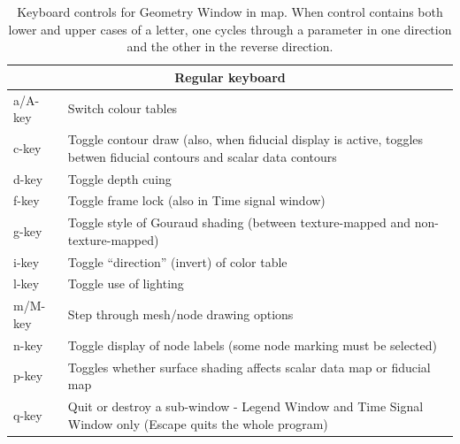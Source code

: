 \begin{table}[htbp]
        \caption{\label{table:keys} Keyboard controls for Geometry Window
          in map{}.  When control contains both lower and upper cases of a
          letter, one cycles through a parameter in one direction and the
          other in the reverse direction.}
    \begin{center}
        \begin{tabular}{|l|p{6in}|} \hline
        \multicolumn{2}{|c|}{\textbf{Regular keyboard}} \\ \hline
        a/A-key   &       Switch colour tables \\ \hline
        c-key   &       Toggle contour draw  (also, when fiducial display
	is active, toggles betwen fiducial contours and scalar data contours \\ \hline
        d-key   &       Toggle depth cuing\\ \hline
        f-key   &       Toggle frame lock (also in Time signal window)\\ \hline
       g-key   &       Toggle style of Gouraud shading (between
       texture-mapped and non-texture-mapped) \\ \hline 
        i-key   &       Toggle ``direction'' (invert) of color table\\ \hline
        l-key   &       Toggle use of lighting\\ \hline
        m/M-key   &       Step through mesh/node drawing options \\ \hline
        n-key   &       Toggle display of node labels (some node marking
        must be selected)\\ \hline 
        p-key   &       Toggles whether surface shading affects scalar data map or
	fiducial map \\ \hline 
         q-key   &       Quit or destroy a sub-window - Legend Window and
         Time Signal Window only (Escape quits the 
                         whole program) \\ \hline

\end{tabular}
\end{center}
\end{table}
